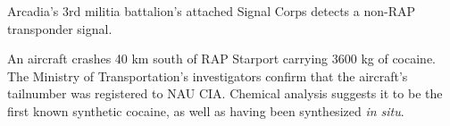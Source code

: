 Arcadia's 3rd militia battalion's attached Signal Corps detects a non-RAP transponder signal.
\StopTimelineDate

An aircraft crashes 40 km south of RAP Starport carrying 3600 kg of cocaine. The Ministry of Transportation's investigators confirm that the aircraft's tailnumber was registered to NAU CIA. Chemical analysis suggests it to be the first known synthetic cocaine, as well as having been synthesized {\it in situ}.
\StopTimelineDate

\stoplines

\StopChapter


